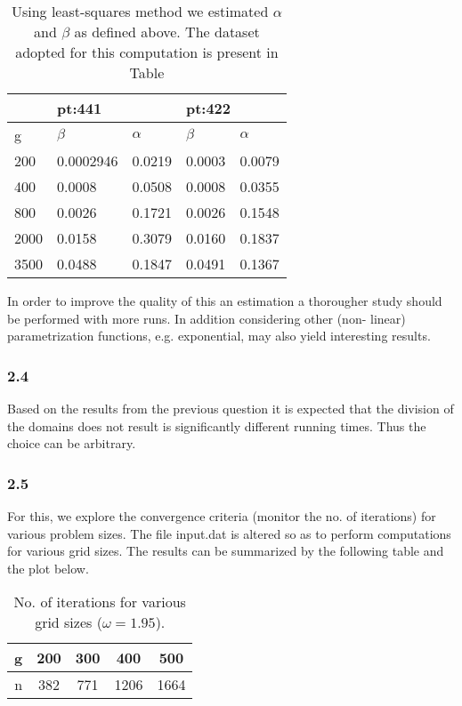 \begin{table*}[]
\centering
\begin{tabular}{@{}lllll@{}}
  \hline
  & \multicolumn{2}{l}{pt:441}  & \multicolumn{2}{l}{pt:422}   \\
  \hline
  g      & $\beta$        & $\alpha$  & $\beta$    & $\alpha$ \\
  \hline
  200  & 0.0002946 & 0.0219 & 0.0003 & 0.0079 \\
  400  & 0.0008    & 0.0508 & 0.0008 & 0.0355 \\
  800  & 0.0026    & 0.1721 & 0.0026 & 0.1548 \\
  2000 & 0.0158    & 0.3079 & 0.0160 & 0.1837 \\
  3500 & 0.0488    & 0.1847 & 0.0491 & 0.1367 \\
\end{tabular}
\caption{Using least-squares method we estimated $\alpha$ and $\beta$ as defined above. The dataset adopted for this computation is present in Table}
\label{tab:linear-fit}
\end{table*}
In order to improve the quality of this an estimation a thorougher study
should be performed with more runs. In addition considering other (non-
linear) parametrization functions, e.g. exponential, may also yield interesting
results.

\subsubsection*{2.4}
Based on the results from the previous question it is expected that the
division of the domains does not result is significantly different running times.
Thus the choice can be arbitrary.

\subsubsection*{2.5}
For this, we explore the convergence criteria (monitor the no. of iterations) for various problem sizes. The file input.dat is altered so as to perform computations for various grid sizes. The results can be summarized by the following table and the plot below.
\begin{table}[h!]
  \centering
  \begin{tabular}{|c|c c c c|}
    \hline
    g & 200 & 300 & 400  & 500  \\
    \hline
    n & 382 & 771 & 1206 & 1664 \\	
    \hline	
  \end{tabular}
  \caption{No. of iterations for various grid sizes ($\omega = 1.95$).}
  \label{n}
\end{table}

